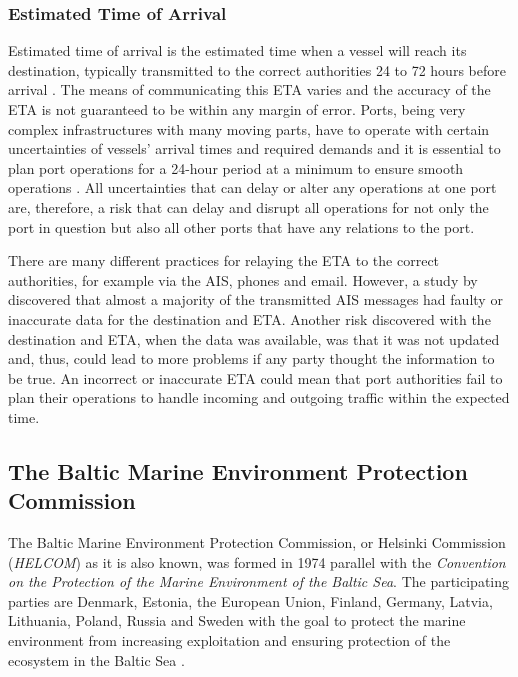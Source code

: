 \documentclass[../main.tex]{subfiles}
\begin{document}
\subsubsection{Estimated Time of Arrival}

Estimated time of arrival is the estimated time when a vessel will reach its destination, typically transmitted to the correct authorities 24 to 72 hours before arrival \cite{Veenstra_2021, EU_2009}. The means of communicating this ETA varies and the accuracy of the ETA is not guaranteed to be within any margin of error. Ports, being very complex infrastructures with many moving parts, have to operate with certain uncertainties of vessels' arrival times and required demands and it is essential to plan port operations for a 24-hour period at a minimum to ensure smooth operations \cite{Fancello_2011}. All uncertainties that can delay or alter any operations at one port are, therefore, a risk that can delay and disrupt all operations for not only the port in question but also all other ports that have any relations to the port.

There are many different practices for relaying the ETA to the correct authorities, for example via the AIS, phones and email. However, a study by  \cite{Mokhtari_2008} discovered that almost a majority of the transmitted AIS messages had faulty or inaccurate data for the destination and ETA. Another risk discovered with the destination and ETA, when the data was available, was that it was not updated and, thus, could lead to more problems if any party thought the information to be true. An incorrect or inaccurate ETA could mean that port authorities fail to plan their operations to handle incoming and outgoing traffic within the expected time.

\subsection{The Baltic Marine Environment Protection Commission}

The Baltic Marine Environment Protection Commission, or Helsinki Commission (\textit{HELCOM}) as it is also known, was formed in 1974 parallel with the \textit{Convention on the Protection of the Marine Environment of the Baltic Sea}. The participating parties are Denmark, Estonia, the European Union, Finland, Germany, Latvia, Lithuania, Poland, Russia and Sweden with the goal to protect the marine environment from increasing exploitation and ensuring protection of the ecosystem in the Baltic Sea \cite{HELCOM_2014}.
\end{document}
